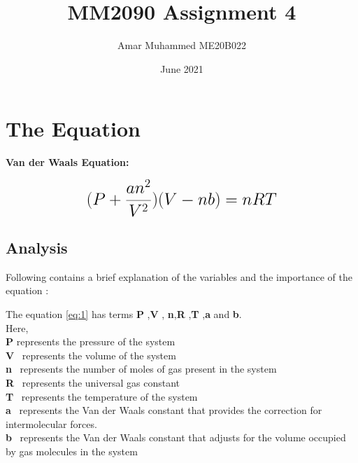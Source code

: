 \documentclass[a4paper, 11pt]{article}
\begin{document}
\title{MM2090 Assignment 4}
\author{Amar Muhammed ME20B022}
\date{June 2021}
\maketitle

\section{The Equation}

\textbf{Van der Waals Equation:}  

\begin{equation}
 {\LARGE{\textbf{$(P + \frac{an^2}{V^2})(V-nb) = nRT$}}}
 \label{eq:1}
\end{equation}


\subsection{Analysis}
Following contains a brief explanation of the variables and the importance of the equation :
\begin{itemize}

    {\normalsize {The equation \ref{eq:1}  has terms \textbf{P} ,\textbf{V} , \textbf{n},\textbf{R} ,\textbf{T} ,\textbf{a} and \textbf{b}.}}\\

{\normalsize { Here,}}\\
{\normalsize {\textbf{P} represents the pressure of the system  }}\\
{\normalsize {\textbf{V} \  represents the volume of the system}}\\
{\normalsize {\textbf{n} \  represents the number of moles of gas present in the system}}\\
{\normalsize {\textbf{R} \  represents the universal gas constant}}\\
{\normalsize{\textbf{T} \ represents the temperature of the system}}\\
{\normalsize{\textbf{a} \ represents the Van der Waals constant that provides the correction for intermolecular forces.}}\\
{\normalsize{\textbf{b} \ represents the Van der Waals constant that adjusts for the volume occupied by gas molecules in the system}}
\end{itemize}
\end{document}

